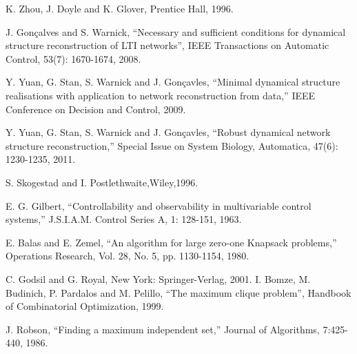 \documentclass[twocolumn,12pt]{autart}
\theoremstyle{plain}
\begin{document}
\begin{thebibliography}{1}








K. Zhou, J. Doyle and K. Glover,  \newblock  Prentice Hall, 1996.

 J. Gon\c{c}alves and S. Warnick, ``Necessary and sufficient conditions for dynamical structure reconstruction of LTI networks'', IEEE Transactions on Automatic Control, 53(7): 1670-1674, 2008.

Y. Yuan, G. Stan, S. Warnick and J. Gon\c{c}avles, ``Minimal dynamical structure realisations with application to network reconstruction from data,'' IEEE Conference on Decision and Control, 2009.

Y. Yuan, G. Stan, S. Warnick and J. Gon\c{c}avles, ``Robust dynamical network structure reconstruction,'' Special Issue on System Biology, Automatica, 47(6): 1230-1235, 2011.

 S. Skogestad and I. Postlethwaite,\newblock Wiley,1996.

E. G. Gilbert, ``Controllability and observability in multivariable control systems,'' J.S.I.A.M. Control Series A, 1: 128-151, 1963.





E. Balas and E. Zemel, ``An algorithm for large zero-one Knapsack problems,'' Operations Research, Vol. 28, No. 5, pp. 1130-1154, 1980. 


 C. Godsil and G. Royal, \newblock New York: Springer-Verlag, 2001.
I. Bomze, M. Budinich, P. Pardalos and M. Pelillo, ``The maximum clique problem'', Handbook of Combinatorial Optimization, 1999.

J. Robson, ``Finding a maximum independent set,'' Journal of Algorithms, 7:425-440, 1986.

\end{thebibliography}


\appendix
\end{document}
